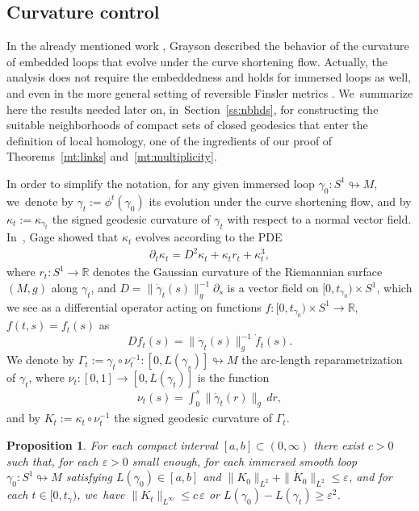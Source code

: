 \documentclass[11pt]{article}
\let\epsilon\varepsilon
\newcommand{\R}{\mathbb{R}}
\theoremstyle{plain}
\newtheorem{Prop}[Thm]{Proposition}
\theoremstyle{definition}
\begin{document}
\subsection{Curvature control}\label{ss:curvature}

In the already mentioned work \cite{Grayson:1989aa}, Grayson described the behavior of the curvature of embedded loops that evolve under the curve shortening flow. Actually, the analysis does not require the embeddedness and holds for immersed loops as well, and even in the more general setting of reversible Finsler metrics \cite[\S 2.5]{De-Philippis:2022aa}. We~summarize here the results needed later on, in~Section~\ref{ss:nbhds}, for constructing the suitable neighborhoods of compact sets of closed geodesics that enter the definition of local homology, one of the ingredients of our proof of Theorems~\ref{mt:links} and~\ref{mt:multiplicity}.

In order to simplify the notation, for any given immersed loop $\gamma_0:S^1\looparrowright M$, we~denote by $\gamma_t:=\phi^t(\gamma_0)$ its evolution under the curve shortening flow, and by $\kappa_t:=\kappa_{\gamma_t}$ the signed geodesic curvature of $\gamma_t$ with respect to a normal vector field. In~\cite[Lem.\,1.2]{Gage:1990aa}, Gage showed that $\kappa_t$ evolves according to the PDE
\begin{align}
\label{e:PDE_curvature}
\partial_t\kappa_t=D^2\kappa_t+\kappa_t r_t+\kappa_t^3,
\end{align}
where $r_t:S^1\to\R$ denotes the Gaussian curvature of the Riemannian surface $(M,g)$ along $\gamma_t$, and $D=\|\dot\gamma_t(s)\|_g^{-1}\partial_s$ is a vector field on $[0,t_{\gamma_0})\times S^1$, which we see as a differential operator acting on functions $f:[0,t_{\gamma_0})\times S^1\to\R$, $f(t,s)=f_t(s)$ as
\[
Df_t(s)=\|\dot\gamma_t(s)\|_g^{-1}\dot f_t(s).
\]
We denote by $\Gamma_t:=\gamma_t\circ\nu_t^{-1}:[0,L(\gamma_s)]\looparrowright M$ the arc-length reparametrization of $\gamma_t$, where $\nu_t:[0,1]\to[0,L(\gamma_t)]$ is the function
\begin{align*}
\nu_t(s) = \int_0^s \|\dot\gamma_t(r)\|_g\,dr,
\end{align*}
and by $K_t:=\kappa_t\circ\nu_t^{-1}$ the signed geodesic curvature of $\Gamma_t$.

\begin{Prop}\label{p:curvature_control}
For each compact interval $[a,b]\subset(0,\infty)$ there exist $c>0$ such that, for each $\epsilon>0$ small enough, for each immersed smooth loop $\gamma_0:S^1\looparrowright M$ satisfying $L(\gamma_0)\in[a,b]$ and $\|K_0\|_{L^2}+\|\dot K_0\|_{L^2}\leq\epsilon$, and for each $t\in[0,t_\gamma)$, we~have $\|K_t\|_{L^\infty}\leq c\,\epsilon$ or $L(\gamma_0)-L(\gamma_t)\geq \epsilon^2$.
\end{Prop}
\end{document}
